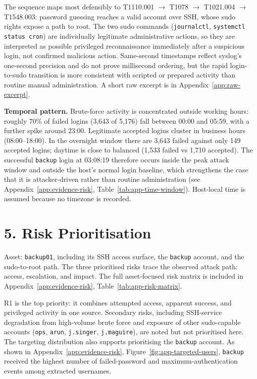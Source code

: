 \documentclass[10pt,a4paper]{article}
\newcommand{\tightsection}[1]{\vspace{6pt}\section*{#1}\vspace{-1pt}}
\begin{document}
The sequence maps most defensibly to T1110.001 $\rightarrow$ T1078 $\rightarrow$ T1021.004 $\rightarrow$ T1548.003: password guessing reaches a valid account over SSH, whose sudo rights expose a path to root. The two sudo commands (\texttt{journalctl}, \texttt{systemctl status cron}) are individually legitimate administrative actions, so they are interpreted as possible privileged reconnaissance immediately after a suspicious login, not confirmed malicious action. Same-second timestamps reflect syslog's one-second precision and do not prove millisecond ordering, but the rapid login-to-sudo transition is more consistent with scripted or prepared activity than routine manual administration. A short raw excerpt is in Appendix~\ref{app:raw-excerpt}.

\textbf{Temporal pattern.} Brute-force activity is concentrated outside working hours: roughly 70\% of failed logins (3,643 of 5,176) fall between 00:00 and 05:59, with a further spike around 23:00. Legitimate accepted logins cluster in business hours (08:00--18:00). In the overnight window there are 3,643 failed against only 149 accepted logins; daytime is close to balanced (1,533 failed vs 1,710 accepted). The successful \texttt{backup} login at 03:08:19 therefore occurs inside the peak attack window and outside the host's normal login baseline, which strengthens the case that it is attacker-driven rather than routine administration (see Appendix~\ref{app:evidence-risk}, Table~\ref{tab:app-time-window}). Host-local time is assumed because no timezone is recorded.

\tightsection{5. Risk Prioritisation}

Asset: \texttt{backup01}, including its SSH access surface, the \texttt{backup} account, and the sudo-to-root path. The three prioritised risks trace the observed attack path: access, escalation, and impact. The full asset-focused risk matrix is included in Appendix~\ref{app:evidence-risk}, Table~\ref{tab:app-risk-matrix}.

R1 is the top priority: it combines attempted access, apparent success, and privileged activity in one source. Secondary risks, including SSH-service degradation from high-volume brute force and exposure of other sudo-capable accounts (\texttt{ops}, \texttt{arun}, \texttt{j.singer}, \texttt{j.maguire}), are noted but not prioritised here. The targeting distribution also supports prioritising the \texttt{backup} account. As shown in Appendix~\ref{app:evidence-risk}, Figure~\ref{fig:app-targeted-users}, \texttt{backup} received the highest number of failed-password and maximum-authentication events among extracted usernames.
\end{document}
